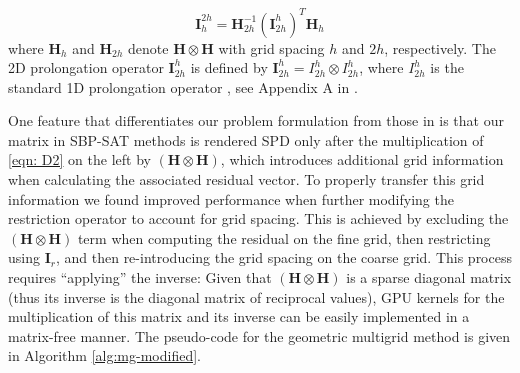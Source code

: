 \begin{equation}
    \boldsymbol{I}_{h}^{2h} = \boldsymbol{H}_{2h}^{-1} \left(\boldsymbol{I}_{2h}^h\right)^T\boldsymbol{H}_h
\end{equation}
%
where $\boldsymbol{H}_{h}$ and $\boldsymbol{H}_{2h}$ denote $\boldsymbol{H} \otimes \boldsymbol{H}$ with grid spacing $h$ and $2h$, respectively. The 2D prolongation operator $\boldsymbol{I}_{2h}^h$ is defined by $\boldsymbol{I}_{2h}^h = I_{2h}^h \otimes I_{2h}^h$, where $I_{2h}^h$ is the standard 1D prolongation operator \citep{10.5555/357695}, see Appendix A in \citep{RUGGIU2018216}.

One feature that differentiates our problem formulation from those in \citep{RUGGIU2018216} is that our matrix in SBP-SAT methods is rendered SPD only after the multiplication of \eqref{eqn: D2} on the left by $\left(\boldsymbol{H} \otimes \boldsymbol{H} \right)$, which introduces additional grid information when calculating the associated residual vector. To properly transfer this grid information we found improved performance when further modifying the restriction operator to account for grid spacing. This is achieved by excluding the $\left(\boldsymbol{H} \otimes \boldsymbol{H} \right)$ term when computing the residual on the fine grid, then restricting using $\boldsymbol{I}_r$, and then re-introducing the grid spacing on the coarse grid. This process requires ``applying'' the inverse: Given that $\left(\boldsymbol{H} \otimes \boldsymbol{H} \right)$ is a sparse diagonal matrix (thus its inverse is the diagonal matrix of reciprocal values), GPU kernels for the multiplication of this matrix and its inverse can be easily implemented in a matrix-free manner. The pseudo-code for the geometric multigrid method is given in Algorithm \autoref{alg:mg-modified}.





